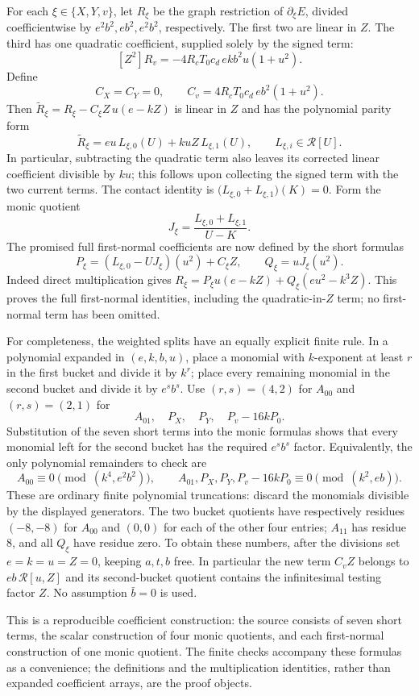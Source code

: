 For each $\xi\in\{X,Y,v\}$, let $R_\xi$ be the graph restriction of $\partial_\xi E$, divided coefficientwise by $e^2b^2,eb^2,e^2b^2$, respectively. The first two are linear in $Z$. The third has one quadratic coefficient, supplied solely by the signed term:
\[
[Z^2]R_v=-4R_cT_0c_d\,e k b^2u(1+u^2).
\]
Define
\[
C_X=C_Y=0,\qquad C_v=4R_cT_0c_d\,eb^2(1+u^2).
\]
Then $\widetilde R_\xi=R_\xi-C_\xi Z\,u(e-kZ)$ is linear in $Z$ and has the polynomial parity form
\[
\widetilde R_\xi=eu\,L_{\xi,0}(U)+kuZ\,L_{\xi,1}(U),
\qquad L_{\xi,i}\in\mathcal R[U].
\]
In particular, subtracting the quadratic term also leaves its corrected linear coefficient divisible by $ku$; this follows upon collecting the signed term with the two current terms. The contact identity is
$\big(L_{\xi,0}+L_{\xi,1}\big)(K)=0$. Form the monic quotient
\[
J_\xi=\frac{L_{\xi,0}+L_{\xi,1}}{U-K}.
\]
The promised full first-normal coefficients are now defined by the short formulas
\[
P_\xi=(L_{\xi,0}-UJ_\xi)(u^2)+C_\xi Z,
\qquad Q_\xi=uJ_\xi(u^2).
\]
Indeed direct multiplication gives
$R_\xi=P_\xi u(e-kZ)+Q_\xi(eu^2-k^3Z)$.
This proves the full first-normal identities, including the quadratic-in-$Z$ term; no first-normal term has been omitted.

For completeness, the weighted splits have an equally explicit finite rule. In a polynomial expanded in $(e,k,b,u)$, place a monomial with $k$-exponent at least $r$ in the first bucket and divide it by $k^r$; place every remaining monomial in the second bucket and divide it by $e^s b^s$. Use $(r,s)=(4,2)$ for $A_{00}$ and $(r,s)=(2,1)$ for
\[
A_{01},\quad P_X,\quad P_Y,\quad P_v-16kP_0.
\]
Substitution of the seven short terms into the monic formulas shows that every monomial left for the second bucket has the required $e^s b^s$ factor. Equivalently, the only polynomial remainders to check are
\[
A_{00}\equiv0\pmod{(k^4,e^2b^2)},\qquad
A_{01},P_X,P_Y,P_v-16kP_0\equiv0\pmod{(k^2,eb)}.
\]
These are ordinary finite polynomial truncations: discard the monomials divisible by the displayed generators. The two bucket quotients have respectively residues $(-8,-8)$ for $A_{00}$ and $(0,0)$ for each of the other four entries; $A_{11}$ has residue $8$, and all $Q_\xi$ have residue zero. To obtain these numbers, after the divisions set $e=k=u=Z=0$, keeping $a,t,b$ free. In particular the new term $C_vZ$ belongs to $eb\,\mathcal R[u,Z]$ and its second-bucket quotient contains the infinitesimal testing factor $Z$. No assumption $\bar b=0$ is used.

This is a reproducible coefficient construction: the source consists of seven short terms, the scalar construction of four monic quotients, and each first-normal construction of one monic quotient. The finite checks accompany these formulas as a convenience; the definitions and the multiplication identities, rather than expanded coefficient arrays, are the proof objects.



